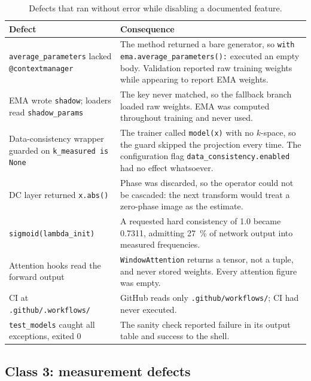 \documentclass[11pt]{article}
\newcommand{\code}[1]{\texttt{\small #1}}
\begin{document}
\begin{table}[h]
\centering
\small
\begin{tabular}{@{}p{}p{}@{}}
\toprule
\textbf{Defect} & \textbf{Consequence} \\
\midrule
\code{average\_parameters} lacked \code{@contextmanager} &
The method returned a bare generator, so \code{with ema.average\_parameters():}
executed an empty body. Validation reported raw training weights while
appearing to report EMA weights. \\[4pt]

EMA wrote \code{shadow}; loaders read \code{shadow\_params} &
The key never matched, so the fallback branch loaded raw weights. EMA was
computed throughout training and never used. \\[4pt]

Data-consistency wrapper guarded on \code{k\_measured is None} &
The trainer called \code{model(x)} with no $k$-space, so the guard skipped the
projection every time. The configuration flag
\code{data\_consistency.enabled} had no effect whatsoever. \\[4pt]

DC layer returned \code{x.abs()} &
Phase was discarded, so the operator could not be cascaded: the next transform
would treat a zero-phase image as the estimate. \\[4pt]

\code{sigmoid(lambda\_init)} &
A requested hard consistency of \num{1.0} became \num{0.7311}, admitting
\SI{27}{\percent} of network output into measured frequencies. \\[4pt]

Attention hooks read the forward output &
\code{WindowAttention} returns a tensor, not a tuple, and never stored weights.
Every attention figure was empty. \\[4pt]

CI at \code{.github/.workflows/} &
GitHub reads only \code{.github/workflows/}; CI had never executed. \\[4pt]

\code{test\_models} caught all exceptions, exited 0 &
The sanity check reported failure in its output table and success to the shell.
\\
\bottomrule
\end{tabular}
\caption{Defects that ran without error while disabling a documented feature.}
\end{table}

\subsection{Class 3: measurement defects}
\end{document}
